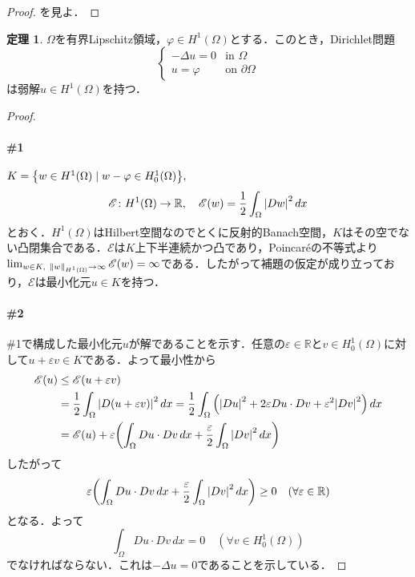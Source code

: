 \documentclass[a4paper]{ltjsarticle}
\newcommand{\Rset}{\mathbb{R}}
\newcommand{\Om}{\Omega}
\newcommand{\pOm}{\partial\Omega}
\newcommand{\1}{\mathbbm{1}}
\numberwithin{equation}{section}
\theoremstyle{definition}
\newtheorem{thm}{定理}[section]
\begin{document}
\begin{proof}
    \cite[Corollary 3.23]{bre}を見よ．
\end{proof}
\begin{thm}
    $\Om$を有界Lipschitz領域，$\varphi\in H^1(\Om)$とする．このとき，Dirichlet問題
    \begin{equation}
        \left\{
            \begin{array}{rl}
                -\Delta u = 0 & \text{in $\Om$}\\
                u=\varphi & \text{on $\pOm$}
            \end{array}
        \right.\label{eq:weak_dirichlet_prob}
    \end{equation}
    は弱解$u\in H^1(\Om)$を持つ．
\end{thm}
\begin{proof}
    \paragraph*{\#1}$K=\qty{w\in H^1(\Om)\mid w-\varphi\in H^1_0(\Om)},$
    \begin{equation}
        \mathscr{E}\colon H^1(\Om)\to \Rset,\quad \mathscr{E}(w)=\frac{1}{2}\int_{\Om}\abs{Dw}^2\,dx
    \end{equation}
    とおく．$H^1(\Om)$はHilbert空間なのでとくに反射的Banach空間，$K$はその空でない凸閉集合である．$\mathscr{E}$は$K$上下半連続かつ凸であり，Poincar\'eの不等式より$\lim_{w\in K,\ \norm{w}_{H^1(\Om)}\to \infty}\mathscr{E}(w)=\infty$である．したがって補題の仮定が成り立っており，$\mathscr{E}$は最小化元$u\in K$を持つ．

    \paragraph*{\#2}\#1で構成した最小化元$u$が解であることを示す．任意の$\varepsilon\in\Rset$と$v\in H^1_0(\Om)$に対して$u+\varepsilon v\in K$である．よって最小性から
    \begin{align}
        \mathscr{E}(u)&\leq \mathscr{E}(u+\varepsilon v)\\
        &=\frac{1}{2}\int_{\Om}\abs{D(u+\varepsilon v)}^2\,dx=\frac{1}{2}\int_{\Om}\qty(\abs{Du}^2+2\varepsilon Du\cdot Dv+\varepsilon^2\abs{Dv}^2)\,dx\\
        &=\mathscr{E}(u)+\varepsilon\qty(\int_{\Om}Du\cdot Dv\,dx+\frac{\varepsilon}{2}\int_{\Om}\abs{Dv}^2\,dx)
    \end{align}
    したがって
    \begin{equation}
        \varepsilon\qty(\int_{\Om}Du\cdot Dv\,dx+\frac{\varepsilon}{2}\int_{\Om}\abs{Dv}^2\,dx)\geq0\quad (\forall \varepsilon\in\Rset )
    \end{equation}
    となる．よって
    \begin{equation}
        \int_{\Om}Du\cdot Dv\,dx=0\quad (\forall v\in H^1_0(\Om))
    \end{equation}
    でなければならない．これは$-\Delta u=0$であることを示している．
\end{proof}
\end{document}
